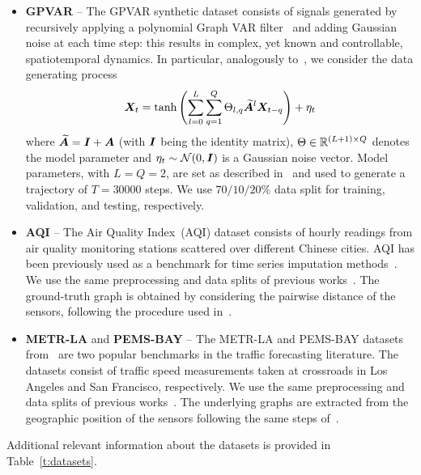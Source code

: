 \begin{itemize}

\item 
\textbf{GPVAR} -- The GPVAR synthetic dataset consists of signals generated by recursively applying a polynomial Graph VAR filter~\citep{isufi2019forecasting} and adding Gaussian noise at each time step: this results in complex, yet known and controllable, spatiotemporal dynamics. In particular, analogously to~\citet{zambon2022az}, we consider the data generating process
\begin{equation}
    {\bm{X}}_t = \text{tanh}\left(\sum_{l=0}^L\sum_{q=1}^Q \Theta_{l,q}\widetilde{{\bm{A}}}^l{\bm{X}}_{t-q}\right) + \eta_t
\end{equation}
where $\widetilde{{\bm{A}}} = {\bm{I}} + {\bm{A}}$ (with ${\bm{I}}$ being the identity matrix), $\Theta \in {\mathbb{R}}^{(L+1) \times Q}$ denotes the model parameter and $\eta_t \sim \mathcal N(0, {\bm{I}})$ is a Gaussian noise vector. Model parameters, with $L=Q=2$, are set as described in~\citep{zambon2022az} and used to generate a trajectory of $T=30000$ steps. We use $70/10/20\%$ data split for training, validation, and testing, respectively.

\item \textbf{AQI} -- The Air Quality Index~(AQI) dataset consists of hourly readings from air quality monitoring stations scattered over different Chinese cities. AQI has been previously used as a benchmark for time series imputation methods~\citep{yi2016st, cini2022filling, marisca2022learning}. We use the same preprocessing and data splits of previous works~\citep{yi2016st}. The ground-truth graph is obtained by considering the pairwise distance of the sensors, following the procedure used in~\citep{cini2022filling}.

\item
\textbf{METR-LA} and \textbf{PEMS-BAY} -- The METR-LA and PEMS-BAY datasets from~\citep{jagadish2014big, li2018diffusion} are two popular benchmarks in the traffic forecasting literature. The datasets consist of traffic speed measurements taken at crossroads in Los Angeles and San Francisco, respectively. We use the same preprocessing and data splits of previous works~\citep{wu2019graph}. The underlying graphs are extracted from the geographic position of the sensors following the same steps of~\cite{wu2019graph}.
\end{itemize} 

Additional relevant information about the datasets is provided in Table~\ref{t:datasets}.

